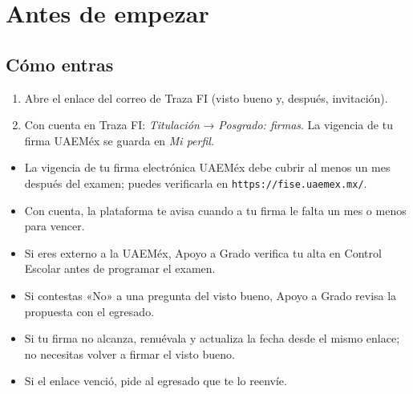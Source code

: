 \section{Antes de empezar}
\subsection*{Cómo entras}
\begin{enumerate}
  \item Abre el enlace del correo de Traza FI (visto bueno y, después, invitación).
  \item Con cuenta en Traza FI: \emph{Titulación} → \emph{Posgrado: firmas}. La vigencia de tu firma UAEMéx se guarda en \emph{Mi perfil}.
\end{enumerate}
\begin{tencuenta}
\begin{itemize}
  \item La vigencia de tu firma electrónica UAEMéx debe cubrir al menos un mes después del examen; puedes verificarla en \texttt{https://fise.uaemex.mx/}.
  \item Con cuenta, la plataforma te avisa cuando a tu firma le falta un mes o menos para vencer.
  \item Si eres externo a la UAEMéx, Apoyo a Grado verifica tu alta en Control Escolar antes de programar el examen.
\end{itemize}
\end{tencuenta}
\begin{algosalemal}
\begin{itemize}
  \item Si contestas «No» a una pregunta del visto bueno, Apoyo a Grado revisa la propuesta con el egresado.
  \item Si tu firma no alcanza, renuévala y actualiza la fecha desde el mismo enlace; no necesitas volver a firmar el visto bueno.
  \item Si el enlace venció, pide al egresado que te lo reenvíe.
\end{itemize}
\end{algosalemal}
